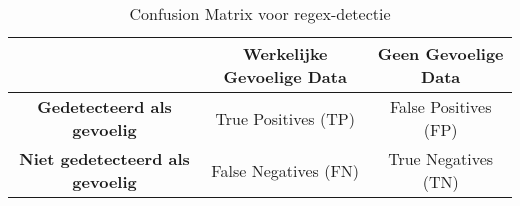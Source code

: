 \begin{table}[H]
    \centering
    \small
    \scriptsize
    \begin{tabular}{|c|c|c|}
        \hline
        \textbf{} & \textbf{Werkelijke Gevoelige Data} & \textbf{Geen Gevoelige Data} \\ \hline
        \textbf{Gedetecteerd als gevoelig} & True Positives (TP) & False Positives (FP) \\ \hline
        \textbf{Niet gedetecteerd als gevoelig} & False Negatives (FN) & True Negatives (TN) \\ \hline
    \end{tabular}
    \caption{Confusion Matrix voor regex-detectie}
    \label{tab:confusion_matrix}
\end{table}





\subsection{}
\label{sec:eva-performantie}

